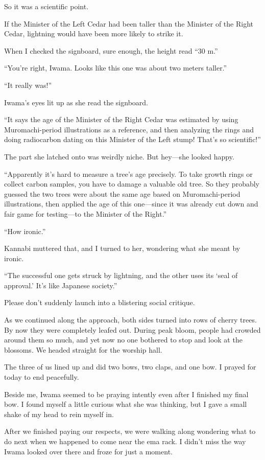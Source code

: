 \documentclass[
    a4paper,
    12pt,
    twoside,
    openany,
    UTF8,
    fontset=windows
]{ctexbook}
\begin{document}
So it was a scientific point.

If the Minister of the Left Cedar had been taller than the Minister of the Right Cedar, lightning would have been more likely to strike it.

When I checked the signboard, sure enough, the height read ``30 m.''

``You're right, Iwama. Looks like this one was about two meters taller.''

``It really was!''

Iwama's eyes lit up as she read the signboard.

``It says the age of the Minister of the Right Cedar was estimated by using Muromachi-period illustrations as a reference, and then analyzing the rings and doing radiocarbon dating on this Minister of the Left stump! That's so scientific!''

The part she latched onto was weirdly niche. But hey---she looked happy.

``Apparently it's hard to measure a tree's age precisely. To take growth rings or collect carbon samples, you have to damage a valuable old tree. So they probably guessed the two trees were about the same age based on Muromachi-period illustrations, then applied the age of this one---since it was already cut down and fair game for testing---to the Minister of the Right.''

``How ironic.''

Kannabi muttered that, and I turned to her, wondering what she meant by ironic.

``The successful one gets struck by lightning, and the other uses its `seal of approval.' It's like Japanese society.''

Please don't suddenly launch into a blistering social critique.

As we continued along the approach, both sides turned into rows of cherry trees. By now they were completely leafed out. During peak bloom, people had crowded around them so much, and yet now no one bothered to stop and look at the blossoms. We headed straight for the worship hall.

The three of us lined up and did two bows, two claps, and one bow. I prayed for today to end peacefully.

Beside me, Iwama seemed to be praying intently even after I finished my final bow. I found myself a little curious what she was thinking, but I gave a small shake of my head to rein myself in.

After we finished paying our respects, we were walking along wondering what to do next when we happened to come near the ema rack. I didn't miss the way Iwama looked over there and froze for just a moment.
\end{document}
